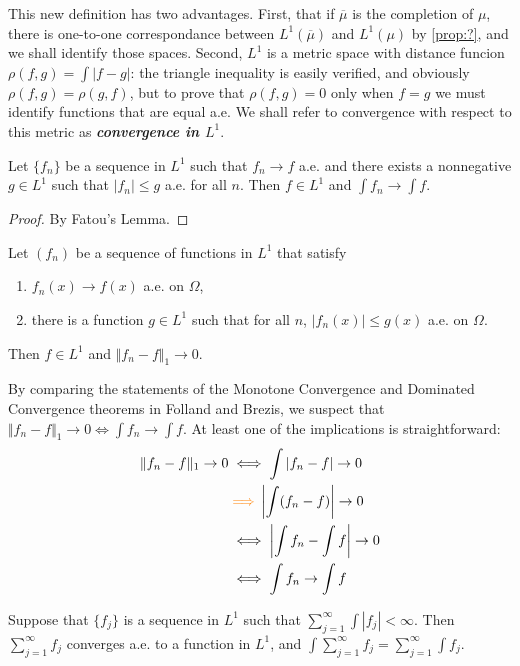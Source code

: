 \documentclass{article}
\theoremstyle{definition}
\numberwithin{equation}{section}
\begin{document}
	This new definition has two advantages. First, that if $\overline{\mu}$ is the completion of $\mu$, there is one-to-one correspondance between $L^1(\overline{\mu})$ and $L^1(\mu)$ by \cref{prop:?}, and we shall identify those spaces. Second, $L^1$ is a metric space with distance funcion $\rho(f,g)=\int|f-g|$: the triangle inequality is easily verified, and obviously $\rho(f,g)=\rho(g,f)$, but to prove that $\rho(f,g)=0$ only when $f=g$ we must identify functions that are equal a.e. We shall refer to convergence with respect to this metric as \textbf{\textit{convergence in $L^1$}}.
	\begin{thm}
		Let $\{f_n\}$ be a sequence in $L^1$ such that $f_n\to f$ a.e. and there exists a nonnegative $g\in L^1$ such that $|f_n|\leq g$ a.e. for all $n$. Then $f\in L^1$ and $\int f_n\to \int f$.
	\end{thm}
	\begin{proof}
		By Fatou's Lemma.
	\end{proof}
	\begin{thm}
		Let $(f_n)$ be a sequence of functions in $L^1$ that satisfy
		\begin{enumerate}
			\item $f_n(x)\to f(x)$ a.e. on $\Omega$,
			\item there is a function $g\in L^1$ such that for all $n$, $|f_n(x)|\leq g(x)$ a.e. on $\Omega$.
		\end{enumerate}
		Then $f\in L^1$ and $\Vert f_n-f\Vert_1\to0$.
	\end{thm}
	\begin{remark}
		By comparing the statements of the Monotone Convergence and Dominated Convergence theorems in Folland and Brezis, we suspect that $\Vert f_n-f\Vert_1\to 0\iff \int f_n\to \int f$. At least one of the implications is straightforward:
		\begin{align*}
			\Vert f_n-f\Vert_1\to 0&\iff \int |f_n-f|\to0\\
			&{\color{orange}\implies}\left|\int (f_n-f)\right|\to0\\
			&\iff \left|\int f_n-\int f\right|\to0\\
			&\iff\int f_n\to\int f
		\end{align*}
	\end{remark}
	\begin{thm}
		Suppose that $\{f_j\}$ is a sequence in $L^1$ such that $\sum_{j=1}^\infty\int|f_j|<\infty$. Then $\sum_{j=1}^\infty f_j$ converges a.e. to a function in $L^1$, and $\int\sum_{j=1}^\infty f_j=\sum_{j=1}^\infty\int f_j$.
	\end{thm}
\end{document}
